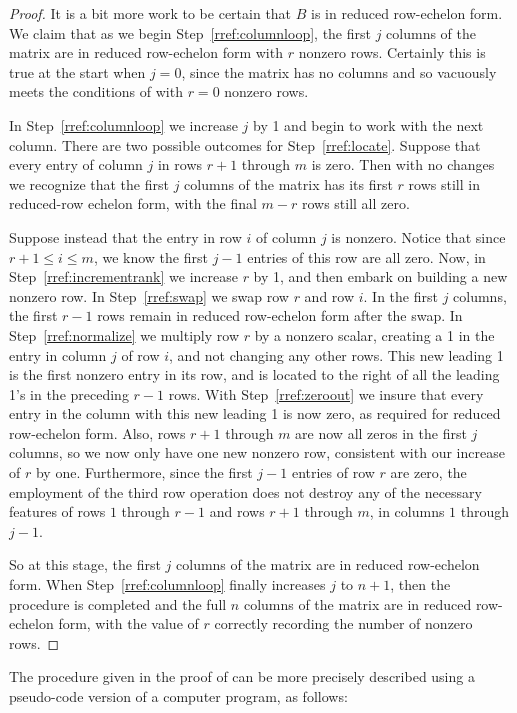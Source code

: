 \begin{proof}
%
It is a bit more work to be certain that $B$ is in reduced row-echelon form.  
We claim that as we begin Step~\ref{rref:columnloop}, the first $j$ columns of the matrix are in reduced row-echelon form with $r$ nonzero rows.   Certainly this is true at the start when $j=0$, since the matrix has no columns and so vacuously meets the conditions of  with $r=0$ nonzero rows.\par
%
In Step~\ref{rref:columnloop} we increase $j$ by 1 and begin to work with the next column.  There are two possible outcomes for Step~\ref{rref:locate}.  Suppose that every entry of column $j$ in rows $r+1$ through $m$ is zero.  Then with no changes we recognize that the first $j$ columns of the matrix has its first $r$ rows still in reduced-row echelon form, with the final $m-r$ rows still all zero.\par
%
Suppose instead that the entry in row $i$ of column $j$ is nonzero.  Notice that since $r+1\leq i\leq m$, we know the first $j-1$ entries of this row are all zero.  Now, in Step~\ref{rref:incrementrank} we increase $r$ by 1, and then embark on building a new nonzero row.  In Step~\ref{rref:swap} we swap row $r$ and row $i$.  In the first $j$ columns, the first $r-1$ rows remain in reduced row-echelon form after the swap.  In Step~\ref{rref:normalize} we multiply row $r$ by a nonzero scalar, creating a 1 in the entry in column $j$ of row $i$, and not changing any other rows.  This new leading 1 is the first nonzero entry in its row, and is located to the right of all the leading 1's in the preceding $r-1$ rows.  With Step~\ref{rref:zeroout} we insure that every entry in the column with this new leading 1 is now zero, as required for reduced row-echelon form.  Also, rows $r+1$ through $m$ are now all zeros in the first $j$ columns, so we now only have one new nonzero row, consistent with our increase of $r$ by one.  Furthermore, since the first $j-1$ entries of row $r$ are zero, the employment of the third row operation does not destroy any of the necessary features of rows $1$ through $r-1$ and rows $r+1$ through $m$, in columns $1$ through $j-1$.\par
%
So at this stage, the first $j$ columns of the matrix are in reduced row-echelon form.  When Step~\ref{rref:columnloop} finally increases $j$ to $n+1$, then the procedure is completed and the full $n$ columns of the matrix are in reduced row-echelon form, with the value of $r$ correctly recording the number of nonzero rows.
%
\end{proof}
%
The procedure given in the proof of  can be more precisely described using a pseudo-code version of a computer program, as follows:
